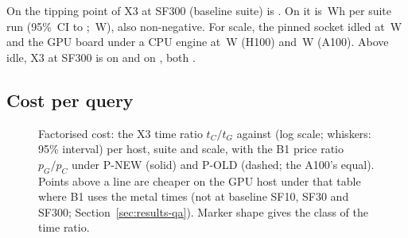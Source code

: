 \documentclass[sigconf]{acmart}
\begin{document}
On \GH{} the tipping point of X3 at SF300 (baseline suite) is
. On \GA{} it is
\,Wh per suite run (95\%~CI  to
; \,W), also non-negative. For scale, the pinned \CG{}
socket idled at \,W and the GPU board under a CPU
engine at \,W (H100) and
\,W (A100). Above idle, X3 at SF300 is
 on \GH{} and 
on \GA, both .

\subsection{Cost per query}
\label{sec:results-cost}

\begin{figure}[t]
\centering
\caption{Factorised cost: the X3 time ratio $t_C/t_G$ against \CG{} (log scale; whiskers: 95\%
interval) per host, suite and scale, with the B1 price ratio $p_G/p_C$ under P-NEW (solid) and P-OLD
(dashed; the A100's equal). Points above a line are cheaper on the GPU host under that table where B1 uses
the metal times (not at baseline SF10, SF30 and SF300; Section~\ref{sec:results-qa}). Marker shape gives
the class of the time ratio.}
\label{fig:factorised}
\end{figure}
\end{document}
